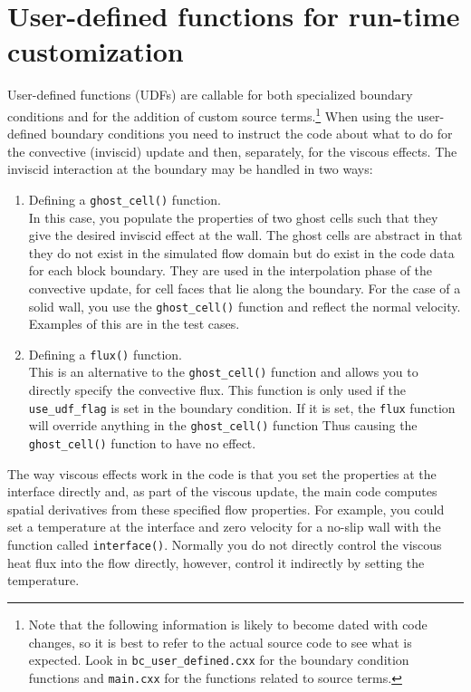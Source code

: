 \section{User-defined functions for run-time customization}
\label{udf-sec}
User-defined functions (UDFs) are callable for both specialized boundary conditions and 
for the addition of custom source terms.\footnote{Note that the following information 
is likely to become dated with code changes,
so it is best to refer to the actual source code to see what is expected.
Look in \texttt{bc\_user\_defined.cxx} for the boundary condition functions and \texttt{main.cxx} for the 
functions related to source terms.}
When using the user-defined boundary conditions you need to instruct the code about 
what to do for the convective (inviscid) update and then, separately, for the viscous effects. 
The inviscid interaction at the boundary may be handled in two ways:
\begin{enumerate}
 \item Defining a \verb!ghost_cell()! function.\\
  In this case, you populate the properties of two ghost cells such that 
  they give the desired inviscid effect at the wall. 
  The ghost cells are abstract in that they do not exist in the simulated flow domain
  but do exist in the code data for each block boundary. 
  They are used in the interpolation phase of the convective update,
  for cell faces that lie along the boundary.
  For the case of a solid wall, you use the \verb!ghost_cell()! function 
  and reflect the normal velocity.
  Examples of this are in the test cases.
 \item Defining a \verb!flux()! function. \\
  This is an alternative to the \verb!ghost_cell()! function and
  allows you to directly specify the convective flux. 
  This function is only used if the \verb!use_udf_flag! is set in the boundary condition. 
  If it is set, the \verb!flux! function will override anything in the \verb!ghost_cell()! function
  Thus causing the \verb!ghost_cell()! function to have no effect. 
\end{enumerate}
The way viscous effects work in the code is that you set the properties at the interface directly
and, as part of the viscous update, the main code computes spatial derivatives from these specified
flow properties. 
For example, you could set a temperature at the interface and zero velocity for a no-slip wall
with the function called \verb!interface()!. 
Normally you do not directly control the viscous heat flux into the flow directly, 
however, control it indirectly by setting the temperature.


